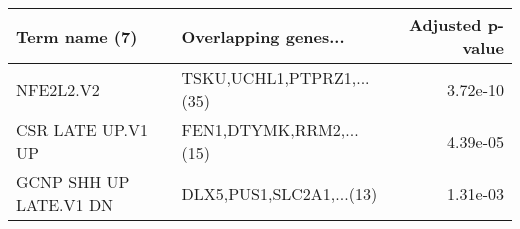 \begin{tabular}{llr}
\toprule
         Term name (7) &      Overlapping genes... &  Adjusted p-value \\
\midrule
             NFE2L2.V2 & TSKU,UCHL1,PTPRZ1,...(35) &          3.72e-10 \\
     CSR LATE UP.V1 UP &   FEN1,DTYMK,RRM2,...(15) &          4.39e-05 \\
GCNP SHH UP LATE.V1 DN &  DLX5,PUS1,SLC2A1,...(13) &          1.31e-03 \\
\bottomrule
\end{tabular}
